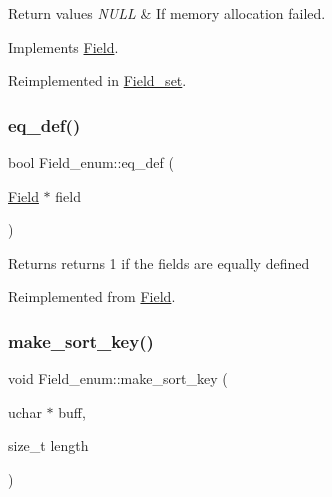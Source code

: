 \begin{DoxyRetVals}{Return values}
{\em N\+U\+LL} & If memory allocation failed. \\
\hline
\end{DoxyRetVals}


Implements \mbox{\hyperlink{classField_a01a9a9aa3a618941e839b1b8793c969d}{Field}}.



Reimplemented in \mbox{\hyperlink{classField__set_a06dc1b03bfa20901a62f344d66374f65}{Field\+\_\+set}}.

\mbox{\label{classField__enum_a56dbcedd28fd3cd4ae349235462f1101}} 
\subsubsection{\texorpdfstring{eq\+\_\+def()}{eq\_def()}}
{\footnotesize\ttfamily bool Field\+\_\+enum\+::eq\+\_\+def (\begin{DoxyParamCaption}\item[{\mbox{\hyperlink{classField}{Field}} $\ast$}]{field }\end{DoxyParamCaption})\hspace{0.3cm}{\ttfamily [virtual]}}

\begin{DoxyReturn}{Returns}
returns 1 if the fields are equally defined 
\end{DoxyReturn}


Reimplemented from \mbox{\hyperlink{classField_a7c9a51f0cc4e8c580838eed3a4f8e846}{Field}}.

\mbox{\label{classField__enum_af029bb9f549b5ee362fbf84c8540b24a}} 
\subsubsection{\texorpdfstring{make\+\_\+sort\+\_\+key()}{make\_sort\_key()}}
{\footnotesize\ttfamily void Field\+\_\+enum\+::make\+\_\+sort\+\_\+key (\begin{DoxyParamCaption}\item[{uchar $\ast$}]{buff,  }\item[{size\+\_\+t}]{length }\end{DoxyParamCaption})\hspace{0.3cm}{\ttfamily [virtual]}}

